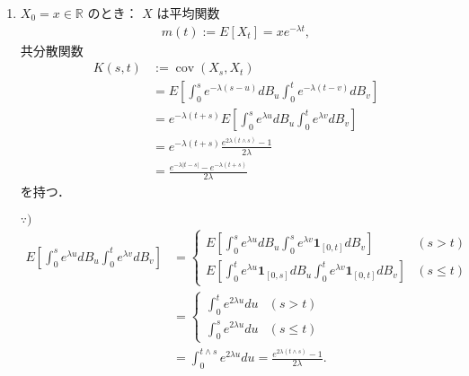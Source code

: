 \documentclass{jsarticle}
\begin{document}
\begin{enumerate}[label=(\roman*)]
    \item
    $X_{0}=x\in\mathbb{R}$ のとき：
    $X$ は平均関数
    \begin{align}
        m(t)
        := E[X_{t}]
        = xe^{-\lambda t},
    \end{align}
    共分散関数
    \begin{align}
        K(s, t)
        &:= \operatorname{cov}(X_{s}, X_{t}) \\
        &= E[\int_{0}^{s}e^{-\lambda(s-u)}dB_{u}\int_{0}^{t}e^{-\lambda(t-v)}dB_{v}] \\
        &= e^{-\lambda(t+s)}E[\int_{0}^{s}e^{\lambda u}dB_{u}\int_{0}^{t}e^{\lambda v}dB_{v}] \\
        &= e^{-\lambda(t+s)}\frac{e^{2\lambda(t\wedge s)}-1}{2\lambda} \\
        &= \frac{e^{-\lambda\lvert t-s\rvert}-e^{-\lambda(t+s)}}{2\lambda}
    \end{align}
    を持つ．

    \begin{screen}
        $\because)$
        \begin{align}
            E[\int_{0}^{s}e^{\lambda u}dB_{u}\int_{0}^{t}e^{\lambda v}dB_{v}]
            &= 
            \begin{cases}
                \displaystyle E[\int_{0}^{s}e^{\lambda u}dB_{u}\int_{0}^{s}e^{\lambda v}\bm{1}_{[0, t]}dB_{v}] & (s>t) \\
                \displaystyle E[\int_{0}^{t}e^{\lambda u}\bm{1}_{[0, s]}dB_{u}\int_{0}^{t}e^{\lambda v}\bm{1}_{[0, t]}dB_{v}] & (s\le t)
            \end{cases} \\
            &= 
            \begin{cases}
                \displaystyle \int_{0}^{t}e^{2\lambda u}du & (s>t) \\
                \displaystyle \int_{0}^{s}e^{2\lambda u}du & (s\le t)
            \end{cases} \\
            &= \int_{0}^{t\wedge s}e^{2\lambda u}du
            = \frac{e^{2\lambda(t\wedge s)}-1}{2\lambda}.
        \end{align}
    \end{screen}
    

\end{enumerate}
\end{document}
